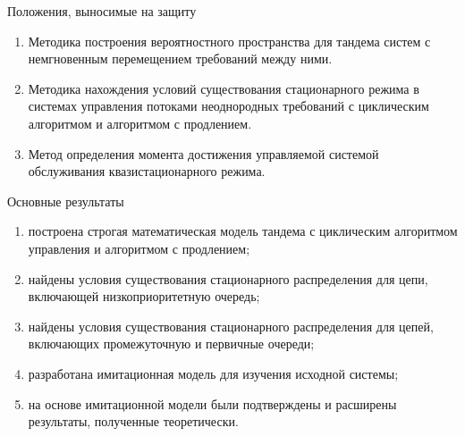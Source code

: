 \documentclass[10pt]{beamer}
\begin{document}
\begin{frame}{Положения, выносимые на защиту}
    \begin{enumerate}

\item Методика построения вероятностного пространства для тандема систем с немгновенным перемещением требований между ними.
\item Методика нахождения условий существования стационарного режима в системах управления потоками неоднородных требований с циклическим алгоритмом и алгоритмом с продлением.
\item Метод определения момента достижения управляемой системой обслуживания квазистационарного режима.
    \end{enumerate}
\end{frame}

\begin{frame}{Основные результаты}
    \begin{enumerate}
        \item построена строгая математическая модель тандема с циклическим алгоритмом управления и алгоритмом с продлением;
        \item найдены условия существования стационарного распределения для цепи, включающей низкоприоритетную очередь;
        \item найдены условия существования стационарного распределения для цепей, включающих промежуточную и первичные очереди;
        \item разработана имитационная модель для изучения исходной системы;
        \item на основе имитационной модели были подтверждены и расширены результаты, полученные теоретически.
    \end{enumerate}
\end{frame}
\end{document}

